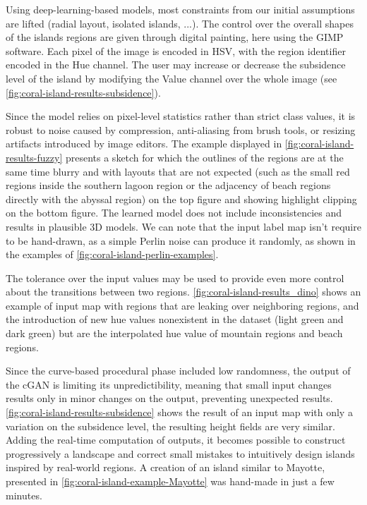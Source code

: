 Using deep-learning-based models, most constraints from our initial assumptions are lifted (radial layout, isolated islands, ...). The control over the overall shapes of the islands regions are given through digital painting, here using the GIMP software. Each pixel of the image is encoded in HSV, with the region identifier encoded in the Hue channel. The user may increase or decrease the subsidence level of the island by modifying the Value channel over the whole image (see \cref{fig:coral-island-results-subsidence}). 

Since the model relies on pixel-level statistics rather than strict class values, it is robust to noise caused by compression, anti-aliasing from brush tools, or resizing artifacts introduced by image editors. The example displayed in \cref{fig:coral-island-results-fuzzy} presents a sketch for which the outlines of the regions are at the same time blurry and with layouts that are not expected (such as the small red regions inside the southern lagoon region or the adjacency of beach regions directly with the abyssal region) on the top figure and showing highlight clipping on the bottom figure. The learned model does not include inconsistencies and results in plausible 3D models. We can note that the input label map isn't require to be hand-drawn, as a simple Perlin noise can produce it randomly, as shown in the examples of \cref{fig:coral-island-perlin-examples}.

The tolerance over the input values may be used to provide even more control about the transitions between two regions. \cref{fig:coral-island-results_dino} shows an example of input map with regions that are leaking over neighboring regions, and the introduction of new hue values nonexistent in the dataset (light green and dark green) but are the interpolated hue value of mountain regions and beach regions.

Since the curve-based procedural phase included low randomness, the output of the cGAN is limiting its unpredictibility, meaning that small input changes results only in minor changes on the output, preventing unexpected results. \cref{fig:coral-island-results-subsidence} shows the result of an input map with only a variation on the subsidence level, the resulting height fields are very similar. Adding the real-time computation of outputs, it becomes possible to construct progressively a landscape and correct small mistakes to intuitively design islands inspired by real-world regions. A creation of an island similar to Mayotte, presented in \cref{fig:coral-island-example-Mayotte} was hand-made in just a few minutes. 

